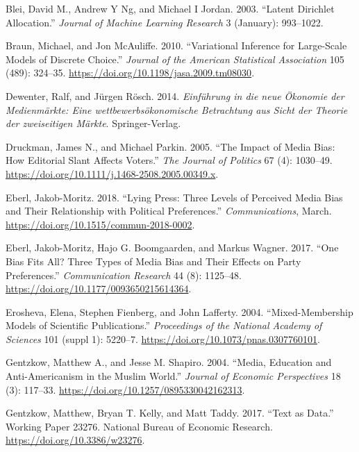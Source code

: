 \documentclass[
]{article}
\begin{document}
\leavevmode\hypertarget{ref-blei_latent_2003}{}%
Blei, David M., Andrew Y Ng, and Michael I Jordan. 2003. ``Latent
Dirichlet Allocation.'' \emph{Journal of Machine Learning Research} 3
(January): 993--1022.

\leavevmode\hypertarget{ref-braun_variational_2010}{}%
Braun, Michael, and Jon McAuliffe. 2010. ``Variational Inference for
Large-Scale Models of Discrete Choice.'' \emph{Journal of the American
Statistical Association} 105 (489): 324--35.
\url{https://doi.org/10.1198/jasa.2009.tm08030}.

\leavevmode\hypertarget{ref-dewenter_einfuhrung_2014}{}%
Dewenter, Ralf, and Jürgen Rösch. 2014. \emph{Einführung in die neue
Ökonomie der Medienmärkte: Eine wettbewerbsökonomische Betrachtung aus
Sicht der Theorie der zweiseitigen Märkte}. Springer-Verlag.

\leavevmode\hypertarget{ref-druckman_impact_2005}{}%
Druckman, James N., and Michael Parkin. 2005. ``The Impact of Media
Bias: How Editorial Slant Affects Voters.'' \emph{The Journal of
Politics} 67 (4): 1030--49.
\url{https://doi.org/10.1111/j.1468-2508.2005.00349.x}.

\leavevmode\hypertarget{ref-eberl_lying_2018}{}%
Eberl, Jakob-Moritz. 2018. ``Lying Press: Three Levels of Perceived
Media Bias and Their Relationship with Political Preferences.''
\emph{Communications}, March.
\url{https://doi.org/10.1515/commun-2018-0002}.

\leavevmode\hypertarget{ref-eberl_one_2017}{}%
Eberl, Jakob-Moritz, Hajo G. Boomgaarden, and Markus Wagner. 2017. ``One
Bias Fits All? Three Types of Media Bias and Their Effects on Party
Preferences.'' \emph{Communication Research} 44 (8): 1125--48.
\url{https://doi.org/10.1177/0093650215614364}.

\leavevmode\hypertarget{ref-erosheva_mixed-membership_2004}{}%
Erosheva, Elena, Stephen Fienberg, and John Lafferty. 2004.
``Mixed-Membership Models of Scientific Publications.''
\emph{Proceedings of the National Academy of Sciences} 101 (suppl 1):
5220--7. \url{https://doi.org/10.1073/pnas.0307760101}.

\leavevmode\hypertarget{ref-gentzkow_media_2004}{}%
Gentzkow, Matthew A., and Jesse M. Shapiro. 2004. ``Media, Education and
Anti-Americanism in the Muslim World.'' \emph{Journal of Economic
Perspectives} 18 (3): 117--33.
\url{https://doi.org/10.1257/0895330042162313}.

\leavevmode\hypertarget{ref-gentzkow_text_2017}{}%
Gentzkow, Matthew, Bryan T. Kelly, and Matt Taddy. 2017. ``Text as
Data.'' Working Paper 23276. National Bureau of Economic Research.
\url{https://doi.org/10.3386/w23276}.
\end{document}
